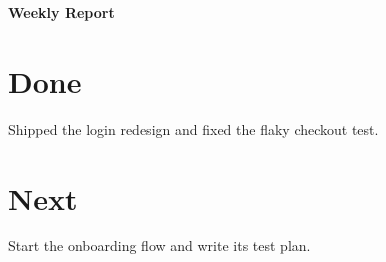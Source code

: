 \documentclass{article}
\begin{document}
\begin{center}
\textbf{\Large Weekly Report}
\end{center}

\section*{Done}
Shipped the login redesign and fixed the flaky checkout test.

\section*{Next}
Start the onboarding flow and write its test plan.
\end{document}
